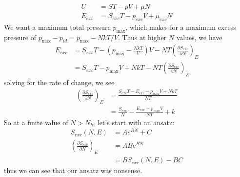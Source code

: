 \documentclass[letterpaper,twocolumn,amsmath,amssymb,pre,aps,10pt]{revtex4-1}
\begin{document}
\begin{align}
  U &= ST - pV + \mu N \\
  E_{exc} &= S_{exc}T - p_{exc}V + \mu_{exc}N
\end{align}
We want a maximum total pressure $p_{\max}$, which makes for a maximum excess pressure of
$p_{\max} - p_{id} = p_{\max} - NkT/V$.  Thus at higher $N$ values, we have
\begin{align}
  E_{exc} &= S_{exc}T - \left(p_{\max}-\frac{NkT}{V}\right)V - NT\left(\frac{\partial S_{exc}}{\partial N}\right)_{E}
  \\
  &= S_{exc}T - p_{\max}V + NkT - NT\left(\frac{\partial S_{exc}}{\partial N}\right)_{E}
\end{align}
solving for the rate of change, we see
\begin{align}
  \left(\frac{\partial S_{exc}}{\partial N}\right)_{E} &= \frac{S_{exc}T - E_{exc} - p_{\max}V + NkT}{NT}
  \\
  &= \frac{S_{exc}}{N} - \frac{E_{exc}+p_{\max}V}{NT} + k
\end{align}
So at a finite value of $N>N_{hi}$ let's start with an ansatz:
\begin{align}
  S_{exc}(N,E) &= A e^{BN} + C \\
  \left(\frac{\partial S_{exc}}{\partial N}\right)_{E} &= AB e^{BN} \\
  &= BS_{exc}(N,E) - BC
\end{align}
thus we can see that our ansatz was nonsense.
\end{document}
